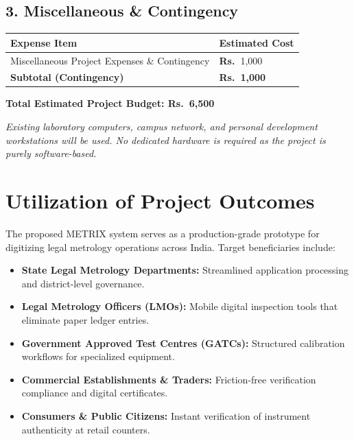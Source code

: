\documentclass[11pt,a4paper]{article}
\newcommand{\INR}{\textbf{Rs.~}}
\begin{document}
\subsection*{3. Miscellaneous \& Contingency}
\begin{table}[htbp]
\centering
\small
\renewcommand{\arraystretch}{1.15}
\begin{tabularx}{0.88\textwidth}{|X|>{\raggedleft\arraybackslash}p{3.2cm}|}
\hline
\rowcolor{tablehead}
\textbf{\color{white}Expense Item} & \textbf{\color{white}Estimated Cost} \\ \hline
Miscellaneous Project Expenses \& Contingency & \INR 1,000 \\ \hline
\rowcolor{tablerow}
\textbf{Subtotal (Contingency)} & \textbf{\INR 1,000} \\ \hline
\end{tabularx}
\end{table}

\begin{center}
\begin{tcolorbox}[
    enhanced,
    colback=lightslate,
    colframe=primarynavy,
    width=0.65\textwidth,
    arc=2.5mm,
    boxrule=1.2pt,
    center
]
    \centering
    {\large \textbf{\color{primarynavy}Total Estimated Project Budget: \INR 6,500}}
\end{tcolorbox}
\end{center}
\textit{\footnotesize Existing laboratory computers, campus network, and personal development workstations will be used. No dedicated hardware is required as the project is purely software-based.}

\newpage

\section{Utilization of Project Outcomes}
The proposed METRIX system serves as a production-grade prototype for digitizing legal metrology operations across India. Target beneficiaries include:
\begin{itemize}
    \item \textbf{State Legal Metrology Departments:} Streamlined application processing and district-level governance.
    \item \textbf{Legal Metrology Officers (LMOs):} Mobile digital inspection tools that eliminate paper ledger entries.
    \item \textbf{Government Approved Test Centres (GATCs):} Structured calibration workflows for specialized equipment.
    \item \textbf{Commercial Establishments \& Traders:} Friction-free verification compliance and digital certificates.
    \item \textbf{Consumers \& Public Citizens:} Instant verification of instrument authenticity at retail counters.
\end{itemize}
\end{document}
